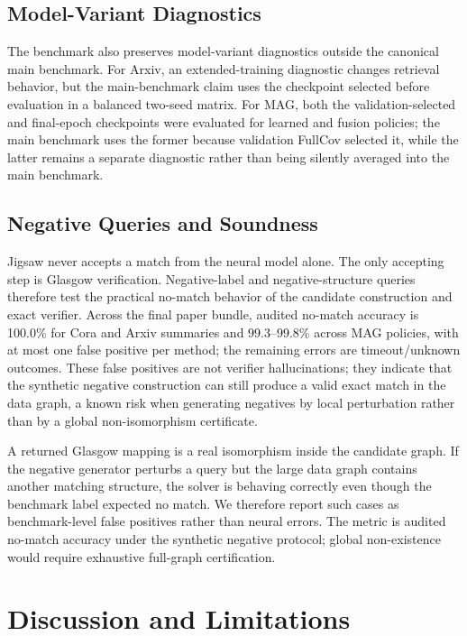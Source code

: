 \documentclass[runningheads]{llncs}
\begin{document}
\subsection{Model-Variant Diagnostics}

The benchmark also preserves model-variant diagnostics outside the canonical main benchmark. For Arxiv, an extended-training diagnostic changes retrieval behavior, but the main-benchmark claim uses the checkpoint selected before evaluation in a balanced two-seed matrix. For MAG, both the validation-selected and final-epoch checkpoints were evaluated for learned and fusion policies; the main benchmark uses the former because validation FullCov selected it, while the latter remains a separate diagnostic rather than being silently averaged into the main benchmark.

\subsection{Negative Queries and Soundness}

Jigsaw never accepts a match from the neural model alone. The only accepting step is Glasgow verification. Negative-label and negative-structure queries therefore test the practical no-match behavior of the candidate construction and exact verifier. Across the final paper bundle, audited no-match accuracy is 100.0\% for Cora and Arxiv summaries and 99.3--99.8\% across MAG policies, with at most one false positive per method; the remaining errors are timeout/unknown outcomes. These false positives are not verifier hallucinations; they indicate that the synthetic negative construction can still produce a valid exact match in the data graph, a known risk when generating negatives by local perturbation rather than by a global non-isomorphism certificate.

A returned Glasgow mapping is a real isomorphism inside the candidate graph. If the negative generator perturbs a query but the large data graph contains another matching structure, the solver is behaving correctly even though the benchmark label expected no match. We therefore report such cases as benchmark-level false positives rather than neural errors. The metric is audited no-match accuracy under the synthetic negative protocol; global non-existence would require exhaustive full-graph certification.

\section{Discussion and Limitations}
\label{sec:limits}
\end{document}
